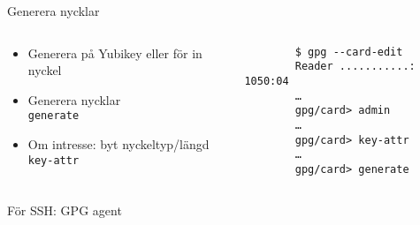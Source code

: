 \documentclass{beamer}
\begin{document}
\begin{frame}[fragile]{Generera nycklar}
  \begin{columns}
    \begin{column}{0.6\linewidth}
      \begin{itemize}
        \item Generera på Yubikey eller för in nyckel\\
        \item Generera nycklar\\
          \texttt{generate}
        \item Om intresse: byt nyckeltyp/längd\\
          \texttt{key-attr}
      \end{itemize}
    \end{column}
    \begin{column}{0.4\linewidth}
      \begin{verbatim}
        $ gpg --card-edit
        Reader ...........: 1050:04
        …
        gpg/card> admin
        …
        gpg/card> key-attr
        …
        gpg/card> generate
      \end{verbatim}
    \end{column}
  \end{columns}
\end{frame}

\begin{frame}[fragile]{För SSH: GPG agent}
\end{frame}
\end{document}
